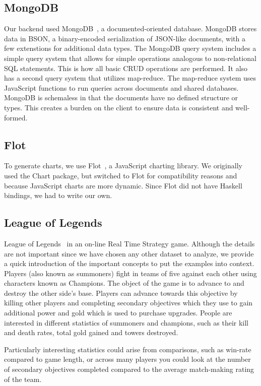 \documentclass[letterpaper,twocolumn,9pt]{article}
\begin{document}
\subsection{MongoDB}

Our backend used MongoDB~\cite{mongo}, a documented-oriented database. MongoDB stores data in BSON, a binary-encoded serialization of JSON-like documents, with a few extenstions for additional data types.  The MongoDB query system includes a simple query system that allows for simple operations analogous to non-relational SQL statements.  This is how all basic CRUD operations are performed.  It also has a second query system that utilizes map-reduce.  The map-reduce system uses JavaScript functions to run queries across documents and shared databases.  MongoDB is schemaless in that the documents have no defined structure or types.  This creates a burden on the client to ensure data is consistent and well-formed.

\subsection{Flot}

To generate charts, we use Flot~\cite{flot}, a JavaScript charting library. We originally used the Chart package, but switched to Flot for compatibility reasons and because JavaScript charts are more dynamic. Since Flot did not have Haskell bindings, we had to write our own.

\subsection{League of Legends}

League of Legends~\cite{lol} in an on-line Real Time Strategy game. Although the details are not important since we have chosen any other dataset to analyze, we provide a quick introduction of the important concepts to put the examples into context. Players (also known as summoners) fight in teams of five against each other using characters known as Champions. The object of the game is to advance to and destroy the other side's base. Players can advance towards this objective by killing other players and completing secondary objectives which they use to gain additional power and gold which is used to purchase upgrades. People are interested in different statistics of summoners and champions, such as their kill and death rates, total gold gained and towers destroyed.

Particularly interesting statistics could arise from comparisons, such as win-rate compared to game length, or across many players you could look at the number of secondary objectives completed compared to the average match-making rating of the team.
\end{document}
